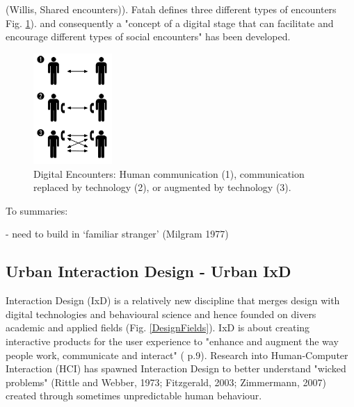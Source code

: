  

(Willis, Shared encounters)).
Fatah defines three different types of encounters Fig. \ref{DigitalEncounterFatah}). 
and consequently a "concept of a digital stage that can facilitate and encourage different types of social encounters" has been developed. 


\begin{figure}[h!] 
\centering
\includegraphics[width=3cm]{Illustrations/DigitalEncounterFatah.png}
\caption [Digital Encounter Fatah] {Digital Encounters: Human communication (1), communication replaced by technology (2), or augmented by technology (3).}
\label{DigitalEncounterFatah}
\end{figure}


To summaries: 

- need to build in ‘familiar stranger’ (Milgram 1977)

\subsection{Urban Interaction Design - Urban IxD}


Interaction Design (IxD) is a relatively new discipline that merges design with digital technologies and behavioural science and hence founded on divers academic and applied fields (Fig. \ref{DesignFields}).
IxD is about creating interactive products for the user experience to "enhance and augment the way people work, communicate and interact" (\cite{Rogers_2015} p.9).
Research into Human-Computer Interaction (HCI) has spawned Interaction Design \cite{Rogers_2015} to better understand "wicked problems" (Rittle and Webber, 1973; Fitzgerald, 2003; Zimmermann, 2007) created through sometimes unpredictable human behaviour.


